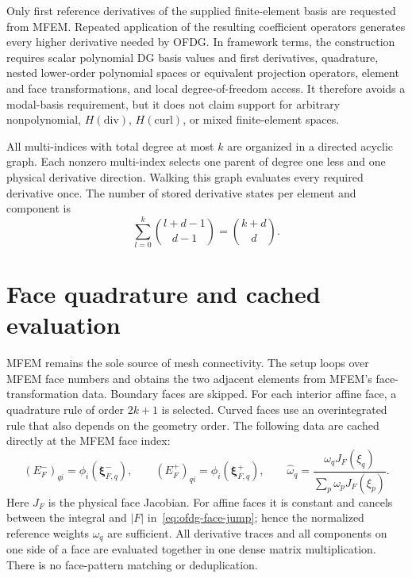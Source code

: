 Only first reference derivatives of the supplied finite-element basis are
requested from MFEM.  Repeated application of the resulting coefficient
operators generates every higher derivative needed by OFDG.  In framework
terms, the construction requires scalar polynomial DG basis values and first
derivatives, quadrature, nested lower-order polynomial spaces or equivalent
projection operators, element and face transformations, and local
degree-of-freedom access.  It therefore avoids a modal-basis requirement, but it
does not claim support for arbitrary nonpolynomial, $H(\mathrm{div})$,
$H(\mathrm{curl})$, or mixed finite-element spaces.

All multi-indices with total degree at most $k$ are organized in a directed
acyclic graph.  Each nonzero multi-index selects one parent of degree one less and
one physical derivative direction.  Walking this graph evaluates every required
derivative once.  The number of stored derivative states per element and component
is
\begin{equation}
  \sum_{l=0}^k\binom{l+d-1}{d-1}=\binom{k+d}{d}.
\end{equation}

\section{Face quadrature and cached evaluation}

MFEM remains the sole source of mesh connectivity.  The setup loops over MFEM
face numbers and obtains the two adjacent elements from MFEM's face-transformation
data.  Boundary faces are skipped.  For each
interior affine face, a quadrature rule of order $2k+1$ is selected.  Curved
faces use an overintegrated rule that also depends on the geometry order.  The following data are cached directly at the MFEM face index:
\begin{equation}
  (E_F^-)_{qi}=\phi_i(\boldsymbol{\xi}_{F,q}^-),
  \qquad
  (E_F^+)_{qi}=\phi_i(\boldsymbol{\xi}_{F,q}^+),
  \qquad
  \widehat{\omega}_q=\frac{\omega_q J_F(\xi_q)}{\sum_p\omega_p J_F(\xi_p)}.
  \label{eq:ofdg-face-evaluation-matrices}
\end{equation}
Here $J_F$ is the physical face Jacobian.  For affine faces it is constant and cancels between the
integral and $|F|$ in~\eqref{eq:ofdg-face-jump}; hence the normalized reference
weights $\widehat{\omega}_q$ are sufficient.  All derivative traces and all
components on one side of a face are evaluated together in one dense matrix
multiplication.  There is no face-pattern matching or deduplication.

